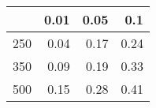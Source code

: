% 
\begin{tabular}{rrrr}
  \hline
 & 0.01 & 0.05 & 0.1 \\ 
  \hline
250 & 0.04 & 0.17 & 0.24 \\ 
  350 & 0.09 & 0.19 & 0.33 \\ 
  500 & 0.15 & 0.28 & 0.41 \\ 
   \hline
\end{tabular}
